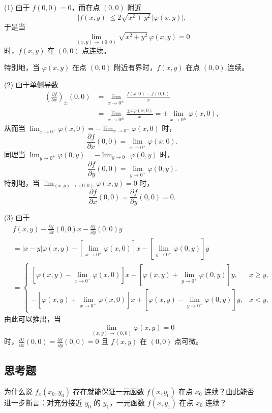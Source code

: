 \begin{xsolution}
(1) 由于 $f(0,0)=0$，而在点 $(0,0)$ 附近
\[
  |f(x,y)|\le2\sqrt{x^2+y^2}\,|\varphi(x,y)|,
\]
于是当
\[
  \lim_{(x,y)\to(0,0)}\sqrt{x^2+y^2}\,\varphi(x,y)=0
\]
时，$f(x,y)$ 在 $(0,0)$ 点连续。

特别地，当 $\varphi(x,y)$ 在点 $(0,0)$ 附近有界时，$f(x,y)$ 在点 $(0,0)$ 连续。

(2) 由于单侧导数
\begin{align*}
  \left(\frac{\partial f}{\partial x}\right)_{\pm}(0,0)
  &=\lim_{x\to0^{\pm}}\frac{f(x,0)-f(0,0)}{x}\\
  &=\lim_{x\to0^{\pm}}\frac{\pm x\varphi(x,0)}{x}
  =\pm\lim_{x\to0^{\pm}}\varphi(x,0),
\end{align*}
从而当 $\lim_{x\to0^+}\varphi(x,0)=-\lim_{x\to0^-}\varphi(x,0)$ 时，
\[
  \frac{\partial f}{\partial x}(0,0)=\lim_{x\to0^+}\varphi(x,0).
\]
同理当 $\lim_{y\to0^+}\varphi(0,y)=-\lim_{y\to0^-}\varphi(0,y)$ 时，
\[
  \frac{\partial f}{\partial y}(0,0)=\lim_{y\to0^+}\varphi(0,y).
\]
特别地，当 $\lim_{(x,y)\to(0,0)}\varphi(x,y)=0$ 时，
\[
  \frac{\partial f}{\partial x}(0,0)=\frac{\partial f}{\partial y}(0,0)=0.
\]

(3) 由于
\begin{align*}
  &f(x,y)-\frac{\partial f}{\partial x}(0,0)x-\frac{\partial f}{\partial y}(0,0)y\\
  &=|x-y|\varphi(x,y)-\left[\lim_{x\to0^+}\varphi(x,0)\right]x
    -\left[\lim_{y\to0^+}\varphi(0,y)\right]y\\
  &=\begin{cases}
    \left[\varphi(x,y)-\lim_{x\to0^+}\varphi(x,0)\right]x
    -\left[\varphi(x,y)+\lim_{y\to0^+}\varphi(0,y)\right]y, & x\ge y,\\
    -\left[\varphi(x,y)+\lim_{x\to0^+}\varphi(x,0)\right]x
    +\left[\varphi(x,y)-\lim_{y\to0^+}\varphi(0,y)\right]y, & x<y,
  \end{cases}
\end{align*}
由此可以推出，当
\[
  \lim_{(x,y)\to(0,0)}\varphi(x,y)=0
\]
时，$\frac{\partial f}{\partial x}(0,0)=\frac{\partial f}{\partial y}(0,0)=0$ 且 $f(x,y)$ 在 $(0,0)$ 点可微。
\end{xsolution}

\subsection{思考题}

\begin{xthought}[1]
为什么说 $f_x(x_0,y_0)$ 存在就能保证一元函数 $f(x,y_0)$ 在点 $x_0$ 连续？由此能否进一步断言：对充分接近 $y_0$ 的 $y_1$，一元函数 $f(x,y_1)$ 在点 $x_0$ 连续？
\end{xthought}


